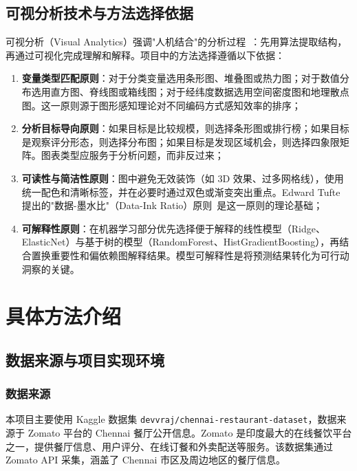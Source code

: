 \documentclass[11pt,a4paper]{article}
\begin{document}
\subsection{可视分析技术与方法选择依据}

可视分析（Visual Analytics）强调"人机结合"的分析过程~\cite{ward}：先用算法提取结构，再通过可视化完成理解和解释。项目中的方法选择遵循以下依据：

\begin{enumerate}[leftmargin=2em]
    \item \textbf{变量类型匹配原则}：对于分类变量选用条形图、堆叠图或热力图；对于数值分布选用直方图、脊线图或箱线图；对于经纬度数据选用空间密度图和地理散点图。这一原则源于图形感知理论对不同编码方式感知效率的排序；

    \item \textbf{分析目标导向原则}：如果目标是比较规模，则选择条形图或排行榜；如果目标是观察评分形态，则选择分布图；如果目标是发现区域机会，则选择四象限矩阵。图表类型应服务于分析问题，而非反过来；

    \item \textbf{可读性与简洁性原则}：图中避免无效装饰（如 3D 效果、过多网格线），使用统一配色和清晰标签，并在必要时通过双色或渐变突出重点。Edward Tufte 提出的"数据-墨水比"（Data-Ink Ratio）原则~\cite{tufte}是这一原则的理论基础；

    \item \textbf{可解释性原则}：在机器学习部分优先选择便于解释的线性模型（Ridge、ElasticNet）与基于树的模型（RandomForest、HistGradientBoosting），再结合置换重要性和偏依赖图解释结果。模型可解释性是将预测结果转化为可行动洞察的关键。
\end{enumerate}

\section{具体方法介绍}

\subsection{数据来源与项目实现环境}

\subsubsection{数据来源}

本项目主要使用 Kaggle 数据集 \texttt{devvraj/chennai-restaurant-dataset}，数据来源于 Zomato 平台的 Chennai 餐厅公开信息。Zomato 是印度最大的在线餐饮平台之一，提供餐厅信息、用户评分、在线订餐和外卖配送等服务。该数据集通过 Zomato API 采集，涵盖了 Chennai 市区及周边地区的餐厅信息。
\end{document}
